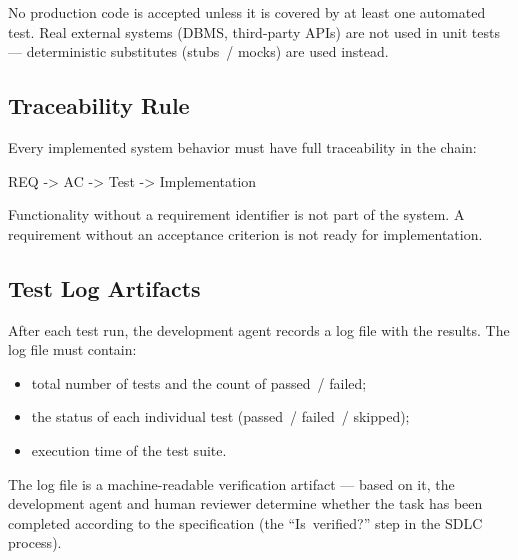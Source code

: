 No production code is accepted unless it is covered by at least one automated test. Real external systems (DBMS, third-party APIs) are not used in unit tests --- deterministic substitutes (stubs~/ mocks) are used instead.

\subsection{Traceability Rule}

Every implemented system behavior must have full traceability in the chain:

\begin{codelisting}
\caption{Traceability Chain}
\label{lst:trace}
\begin{skedcode}
REQ -> AC -> Test -> Implementation
\end{skedcode}
\end{codelisting}

Functionality without a requirement identifier is not part of the system. A requirement without an acceptance criterion is not ready for implementation.

\subsection{Test Log Artifacts}

After each test run, the development agent records a log file with the results.  The log file must contain:

\begin{itemize}
  \item total number of tests and the count of passed~/ failed;
  \item the status of each individual test (passed~/ failed~/ skipped);
  \item execution time of the test suite.
\end{itemize}

The log file is a machine-readable verification artifact --- based on it, the development agent and human reviewer determine whether the task has been completed according to the specification (the ``Is~verified?'' step in the SDLC process).
